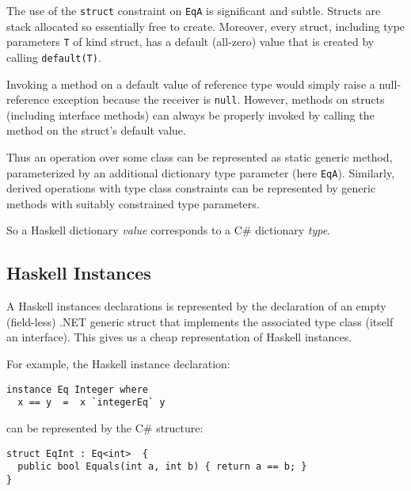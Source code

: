 \documentclass[preprint]{sig-alternate-05-2015}
\begin{document}
The use of the \lstinline{struct} constraint on \lstinline{EqA} is significant and subtle. Structs are stack allocated so essentially free to create.
Moreover, every struct, including type parameters \lstinline{T} of kind struct, has a default (all-zero) value that is created by 
calling \lstinline{default(T)}.

Invoking a method on a default value of reference type would simply raise a null-reference exception because the receiver is \lstinline{null}.
However, methods on structs (including interface methods) can always be properly invoked
by calling the method on the struct's default value. 

Thus an operation over some class can be represented as static generic method, 
parameterized by an additional dictionary type parameter (here \lstinline{EqA}).
Similarly, derived operations with type class constraints can be represented by generic methods with suitably constrained type parameters.

So a Haskell dictionary \emph{value} corresponds to a  C\# dictionary \emph{type}.



\subsection{Haskell Instances}

A Haskell instances declarations is represented by the declaration of an empty (field-less) .NET generic struct that implements the associated type class (itself an interface).
This gives us a cheap representation of Haskell instances. 

For example, the Haskell instance declaration:
\begin{lstlisting}
instance Eq Integer where 
  x == y  =  x `integerEq` y
\end{lstlisting}

can be represented by the C\# structure:
\begin{lstlisting}
struct EqInt : Eq<int>  {
  public bool Equals(int a, int b) { return a == b; }  
}
\end{lstlisting}
\end{document}
